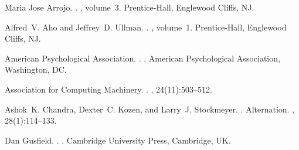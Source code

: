 \documentclass[11pt]{article}
\begin{document}
	\begin{thebibliography}{}
		
		Maria Jose Arrojo.
		.
		, volume~3.
		\newblock Prentice-{Hall}, Englewood Cliffs, NJ.
		
		Alfred~V. Aho and Jeffrey~D. Ullman.
		.
		, volume~1.
		\newblock Prentice-{Hall}, Englewood Cliffs, NJ.
		
		{American Psychological Association}.
		.
		.
		\newblock American Psychological Association, Washington, DC.
		
		{Association for Computing Machinery}.
		.
		, 24(11):503--512.
		
		Ashok~K. Chandra, Dexter~C. Kozen, and Larry~J. Stockmeyer.
		.
		\newblock Alternation.
		,
		28(1):114--133.
		
		Dan Gusfield.
		.
		.
		\newblock Cambridge University Press, Cambridge, UK.
		
	\end{thebibliography}
	
\end{document}

